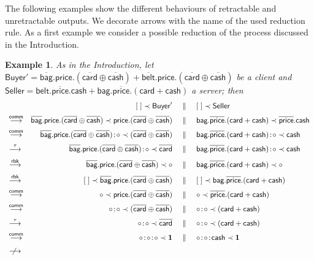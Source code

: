 \documentclass[UKenglish]{eptcs}
\newtheorem{example}[definition]{Example}
\newcommand{\cons}{\!:\!}
\newcommand{\ored}[1]{\stackrel{#1}{\longrightarrow}}      \newcommand{\Ored}[1]{\stackrel{#1}{\Longrightarrow}}
\newcommand{\CommRule}{\textsf{comm}}
\newcommand{\RbkRule}{\textsf{rbk}}
\newcommand{\Bag}{\textsf{bag}}
\newcommand{\DBag}{\Dual{\Bag}}
\newcommand{\Belt}{\textsf{belt}}
\newcommand{\DBelt}{\Dual{\Belt}}
\newcommand{\Price}{\textsf{price}}
\newcommand{\DPrice}{\Dual{\Price}}
\newcommand{\Card}{\textsf{card}}
\newcommand{\DCard}{\Dual{\Card}}
\newcommand{\Cash}{\textsf{cash}}
\newcommand{\DCash}{\Dual{\Cash}}
\newcommand{\Dual}[1]{\overline{#1}}
\newcommand{\stopA}{{\bf 1}}
\newcommand{\emptystack}{[\;]}
\newcommand{\back}{\prec}
\newcommand{\np}[2]{#1\back#2}
\newcommand{\pp}{~\|~}
\begin{document}
\medskip
The following examples show the different behaviours of retractable and unretractable outputs. We decorate arrows with the name of the used reduction rule. 
As a first example we consider a possible reduction of the process discussed in the Introduction.
\begin{example}\label{example1}
{\em As in the Introduction, let
$\textsf{Buyer}' = \DBag.\Price.(\DCard \oplus \DCash) + \DBelt. \Price.(\DCard \oplus \DCash)$ be a client and $\textsf{Seller} = \Belt. \DPrice.\Cash + \Bag.\DPrice.(\Card + \Cash)$ a server; then
\[\begin{array}{lrcl}
  &
\np{\emptystack}{\textsf{Buyer}'}
 & \pp & \np{\emptystack}{\textsf{Seller}}\\[2mm]

 \ored{\CommRule} &
	\np{\DBag.\Price.(\DCard \oplus \DCash)}{\Price.(\DCard \oplus \DCash)}
& \pp & \np{\Bag.\DPrice.(\Card + \Cash)}{\DPrice.\Cash}\\[2mm]

 \ored{\CommRule} &
	\np{\DBag.\Price.(\DCard \oplus \DCash)\cons \circ }{(\DCard \oplus \DCash)}
 & \pp & \np{\Bag.\DPrice.(\Card + \Cash)\cons \circ }{\Cash}\\[2mm]

 \ored{\tau} &
	\np{\DBag.\Price.(\DCard \oplus \DCash)\cons \circ }{\DCard}
& \pp & \np{\Bag.\DPrice.(\Card + \Cash)\cons \circ }{\Cash}\\[2mm]

\ored{\RbkRule} &
	\np{\DBag.\Price.(\DCard \oplus \DCash)}{\circ }
 & \pp & \np{\Bag.\DPrice.(\Card + \Cash)}{\circ }\\[2mm]

\ored{\RbkRule} &
	\np{\emptystack}{\DBag.\Price.(\DCard \oplus \DCash) }
 & \pp & \np{\emptystack}{\Bag.\DPrice.(\Card + \Cash)}\\[2mm]

\ored{\CommRule} &
	\np{\circ}{\Price.(\DCard \oplus \DCash) }
 & \pp & \np{\circ}{\DPrice.(\Card + \Cash)}\\[2mm]

\ored{\CommRule} &
	\np{\circ\cons\circ}{(\DCard \oplus \DCash) }
 & \pp & \np{\circ\cons\circ}{(\Card + \Cash)}\\[2mm]

\ored{\tau} &
	\np{\circ\cons\circ}{\DCard }
 & \pp & \np{\circ\cons\circ}{(\Card + \Cash)}\\[2mm]

\ored{\CommRule} &
	\np{\circ\cons\circ\cons\circ}{\stopA }
 & \pp & \np{\circ\cons\circ\cons\Cash}{\stopA}\\[2mm]

\,\,\not\!\!\ored{}
	
\end{array}\]
}
\end{example}
\end{document}
